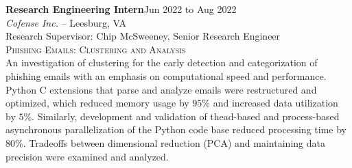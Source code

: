 \documentclass[hidelinks, 10pt]{article}
\begin{document}
{{    \vspace{4mm}

    \begin{minipage}[ct]{0.9\linewidth}
        \textbf{Research Engineering Intern}\hfill Jun 2022 to Aug 2022\\
        \emph{Cofense Inc.} -- Leesburg, VA\\
        Research Supervisor: Chip McSweeney, Senior Research Engineer\\
        {\textsc{Phishing Emails: Clustering and Analysis}}
        \vspace{1mm}\\
        An investigation of clustering for the early detection and categorization of phishing emails with an emphasis on computational speed
        and performance.  Python C extensions that parse and analyze emails were restructured and optimized, which reduced memory usage by
        $95$\% and increased data utilization by $5$\%. Similarly, development and validation of thead-based and process-based asynchronous
        parallelization of the Python code base reduced processing time by $80$\%. Tradeoffs between dimensional reduction (PCA) and
        maintaining data precision were examined and analyzed.
    \end{minipage}

    \vspace{4mm}

}}
\end{document}
